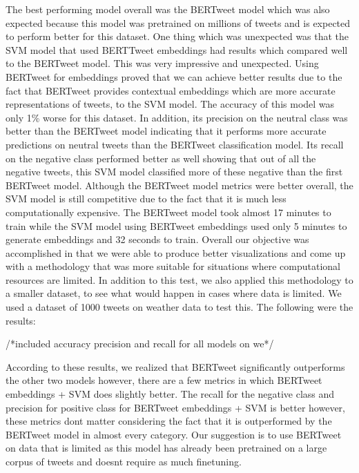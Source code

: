 \documentclass[conference]{IEEEtran}
\begin{document}
The best performing model overall was the BERTweet model which was also expected because this model was pretrained on millions of tweets and is expected to perform better for this dataset. One thing which was unexpected was that the SVM model that used BERTTweet embeddings had results which compared well to the BERTweet model. This was very impressive and unexpected. Using BERTweet for embeddings proved that we can achieve better results due to the fact that BERTweet provides contextual embeddings which are more accurate representations of tweets, to the SVM model. The accuracy of this model was only 1\% worse for this dataset. In addition, its precision on the neutral class was better than the BERTweet model indicating that it performs more accurate predictions on neutral tweets than the BERTweet classification model. Its recall on the negative class performed better as well showing that out of all the negative tweets, this SVM model classified more of these negative than the first BERTweet model.
Although the BERTweet model metrics were better overall, the SVM model is still competitive due to the fact that it is much less computationally expensive.  The BERTweet model took almost 17 minutes to train while the SVM model using BERTweet embeddings used only 5 minutes to generate embeddings and 32 seconds to train. Overall our objective was accomplished in that we were able to produce better visualizations and come up with a methodology that was more suitable for situations where computational resources are limited. In addition to this test, we also applied this methodology to a smaller dataset, to see what would happen in cases where data is limited. We used a dataset of 1000 tweets on weather data to test this. The following were the results:

/*included accuracy precision and recall for all models on we*/

According to these results, we realized that BERTweet significantly outperforms the other two models however, there are a few metrics in which BERTweet embeddings + SVM does slightly better. The recall for the negative class and precision for positive class for BERTweet embeddings + SVM is better however, these metrics dont matter considering the fact that it is outperformed by the BERTweet model in almost every category. Our suggestion is to use BERTweet on data that is limited as this model has already been pretrained on a large corpus of tweets and doesnt require as much finetuning. 
\end{document}
